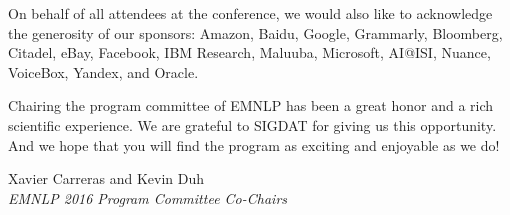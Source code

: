 On behalf of all attendees at the conference, we would also like to acknowledge the generosity of our sponsors: Amazon, Baidu, Google, Grammarly, Bloomberg, Citadel, eBay, Facebook, IBM Research, Maluuba, Microsoft, AI@ISI, Nuance, VoiceBox, Yandex, and Oracle.
  



Chairing the program committee of EMNLP has been a great honor and a
rich scientific experience. 
We are grateful to SIGDAT for giving us this opportunity. 
And we hope that you will find the program as
exciting and enjoyable as we do!

\vskip 2cm

\noindent Xavier Carreras and Kevin Duh\\
\emph{EMNLP 2016 Program Committee Co-Chairs}

\clearpage{}


